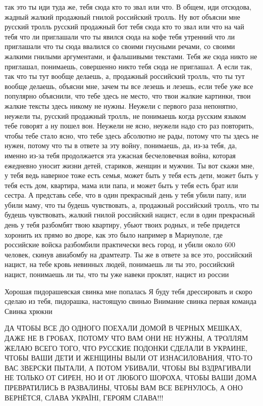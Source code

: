 так это ты иди туда же, тебя сюда кто то звал или что. В общем, иди отсюдова,
жадный жалкий продажный гнилой российский тролль. Ну вот объясни мне русский
тролль русский продажный бот тебя сюда кто то звал или что на чай тебя что ли
приглашали что ты явился сюда на кофе тебя утренний что ли приглашали что ты
сюда ввалился со своими гнусными речами, со своими жалкими гнилыми аргументами,
и фальшивыми текстами. Тебя же сюда никто не приглашал, понимаешь, совершенно
никто тебя сюда не приглашал. А если так, так что ты тут вообще делаешь, а,
продажный российский тролль, что ты тут вообще делаешь, объясни мне, зачем ты
все лезешь и лезешь, если тебе уже все популярно объяснили, что тебе здесь не
место, что твои жалкие картинки, твои жалкие тексты здесь никому не нужны.
Неужели с первого раза непонятно, неужели ты, русский продажный тролль, не
понимаешь когда русским языком тебе говорят а ну пошел вон. Неужели не ясно,
неужели надо сто раз повторить, чтобы тебе стало ясно, что тебе здесь абсолютно
не рады, потому что ты здесь не нужен, потому что ты в ответе за эту войну,
понимаешь, да, из-за тебя, да, именно из-за тебя продолжается эта ужасная
бесчеловечная война, которая ежедневно уносит жизни детей, стариков, женщин и
мужчин. Ты вот скажи мне, у тебя ведь наверное тоже есть семья, может быть у
тебя есть дети, может быть у тебя есть дом, квартира, мама или папа, и может
быть у тебя есть брат или сестра. А представь себе, что в один прекрасный день
у тебя убили папу, или убили маму, что ты будешь чувствовать, а, продажный
российский тролль, что ты будешь чувствовать, жалкий гнилой российский нацист,
если в один прекрасный день у тебя разбомбят твою квартиру, убьют твоих родных,
и тебе придется хоронить их прямо во дворе, как это было например в Мариуполе,
где российские войска разбомбили практически весь город, и убили около 600
человек, скинув авиабомбу на драмтеатр. Ты же в ответе за все это, российский
нацист, на тебе кровь невинных людей, понимаешь ли ты это, российский нацист,
понимаешь ли ты, что ты уже навеки проклят, нацист из россии

Хорошая пидорашевская свинка мне попалась Я буду тебя дрессировать и скоро
сделаю из тебя, пидорашка, настоящую свинью Внимание свинка первая команда
Свинка хрюкни

ДА ЧТОБЫ ВСЕ ДО ОДНОГО ПОЕХАЛИ ДОМОЙ В ЧЕРНЫХ МЕШКАХ, ДАЖЕ НЕ В ГРОБАХ, ПОТОМУ
ЧТО ВАМ ОНИ НЕ НУЖНЫ, А ТРОЛЛЯМ ЖЕЛАЮ ВСЕГО ТОГО, ЧТО РУССКИЕ ПОДОНКИ СДЕЛАЛИ В
УКРАИНЕ, ЧТОБЫ ВАШИ ДЕТИ И ЖЕНЩИНЫ ВЫЛИ ОТ ИЗНАСИЛОВАНИЯ, ЧТО-ТО ВАС ЗВЕРСКИ
ПЫТАЛИ, А ПОТОМ УБИВАЛИ, ЧТОБЫ ВЫ ВЗДРАГИВАЛИ НЕ ТОЛЬКО ОТ СИРЕН, НО И ОТ
ЛЮБОГО ШОРОХА, ЧТОБЫ ВАШИ ДОМА ПРЕВРАТИЛИСЬ В РАЗВАЛИНЫ, ЧТОБЫ ВАМ ВСЕ
ВЕРНУЛОСЬ, А ОНО ВЕРНЁТСЯ, СЛАВА УКРАЇНІ, ГЕРОЯМ СЛАВА!!!

